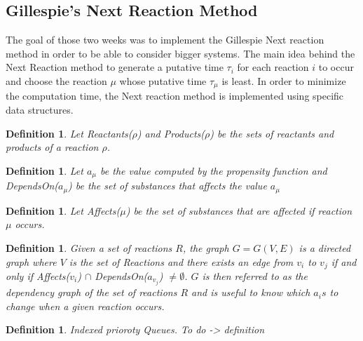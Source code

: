\documentclass[11pt,a4paper]{article}
\newtheorem{defn}[theorem]{Definition}
\begin{document}
\subsection{Gillespie's Next Reaction Method}
The goal of those two weeks was to implement the Gillespie Next reaction method in order to be able to consider bigger systems. The main idea behind the Next Reaction method to generate a putative time $\tau_i$ for each reaction $i$ to occur and choose the reaction $\mu$ whose putative time $\tau_{\mu}$ is least. In order to minimize the computation time, the Next reaction method is implemented using specific data structures.

\begin{defn}
Let Reactants($\rho$) and Products($\rho$) be the sets of reactants and products of a reaction $\rho$.
\end{defn}

\begin{defn} Let $a_{\mu}$ be the value computed by the propensity function and DependsOn($a_{\mu}$) be the set of substances that affects the value $a_{\mu}$
\end{defn}

\begin{defn} Let Affects($\mu$) be the set of substances that are affected if reaction $\mu$ occurs.
\end{defn}

\begin{defn} Given a set of reactions $R$, the graph $G = G(V, E)$ is a directed graph where $V$ is the set of Reactions and there exists an edge from $v_i$ to $v_j$ if and only if  Affects($v_i$) $\cap$ DependsOn($a_{v_{j}}$) $\neq \emptyset$. $G$ is then referred to as the dependency graph of the set of reactions $R$ and is useful to know which $a_is$ to change when a given reaction occurs.
\end{defn}

\begin{defn} Indexed prioroty Queues. To do -> definition
\end{defn}
\end{document}
